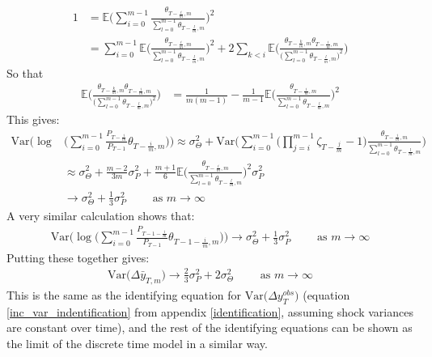 \begin{align*}
1 &= \mathbb{E} \Bigg(\sum_{i=0}^{m-1} \frac{\theta_{T-\frac{i}{m},m}}{\sum_{l=0}^{m-1} \theta_{T-\frac{l}{m},m}} \Bigg)^2 \\
&= \sum_{i=0}^{m-1}\mathbb{E} \Bigg( \frac{\theta_{T-\frac{i}{m},m}}{\sum_{l=0}^{m-1} \theta_{T-\frac{l}{m},m}} \Bigg)^2 + 2 \sum_{k<i} \mathbb{E} \Bigg( \frac{\theta_{T-\frac{k}{m},m} \theta_{T-\frac{i}{m},m}}{\Big( \sum_{l=0}^{m-1} \theta_{T-\frac{l}{m},m} \Big)^2} \Bigg) 
\end{align*}
So that
\begin{align*}
\mathbb{E} \Bigg( \frac{\theta_{T-\frac{k}{m},m} \theta_{T-\frac{i}{m},m}}{\Big( \sum_{l=0}^{m-1} \theta_{T-\frac{l}{m},m} \Big)^2} \Bigg) &= \frac{1}{m(m-1)} -\frac{1}{m-1} \mathbb{E} \Bigg( \frac{\theta_{T-\frac{i}{m},m}}{\sum_{l=0}^{m-1} \theta_{T-\frac{l}{m},m}} \Bigg)^2
\end{align*}
This gives:
\begin{align*}
\mathrm{Var}\Bigg(\log &\Bigg(\sum_{i=0}^{m-1} \frac{P_{T-\frac{i}{m}}}{P_{T-1}} \theta_{T-\frac{i}{m},m} \Bigg) \Bigg)
\approx \sigma^2_{\Theta} + \mathrm{Var}\Bigg( \sum_{i=0}^{m-1} \Big(\prod_{j=i}^{m-1} \zeta_{T-\frac{j}{m}}   -1\Big) \frac{\theta_{T-\frac{i}{m},m}}{\sum_{l=0}^{m-1} \theta_{T-\frac{l}{m},m}} \Bigg) \\
&\approx \sigma^2_{\Theta} +  \frac{m-2}{3m} \sigma^2_P +  \frac{m+1}{6}\mathbb{E} \Bigg(\frac{\theta_{T-\frac{i}{m},m}}{\sum_{l=0}^{m-1} \theta_{T-\frac{l}{m},m}} \Bigg)^2 \sigma^2_P \\
& \rightarrow \sigma^2_{\Theta} +  \frac{1}{3} \sigma^2_P \qquad \text{  as } m\rightarrow \infty
\end{align*}
A very similar calculation shows that:
\begin{align*}
\mathrm{Var}\Bigg(\log\Bigg(\sum_{i=0}^{m-1}\frac{ P_{T-1-\frac{i}{m}}}{P_{T-1}} \theta_{T-1-\frac{i}{m},m}\Bigg) \Bigg) \rightarrow \sigma^2_{\Theta} +  \frac{1}{3} \sigma^2_P \qquad \text{  as } m\rightarrow \infty
\end{align*}
Putting these together gives:
\begin{align*}
\mathrm{Var}\Big(\Delta \bar{y}_{T,m}\Big)  \rightarrow \frac{2}{3}\sigma^2_P + 2\sigma^2_{\Theta} \qquad \text{  as } m\rightarrow \infty
\end{align*}
This is the same as the identifying equation for $\mathrm{Var}\Big(\Delta y^{obs}_T \Big)$ (equation \ref{inc_var_indentification} from appendix \ref{identification}, assuming shock variances are constant over time), and the rest of the identifying equations can be shown as the limit of the discrete time model in a similar way.





